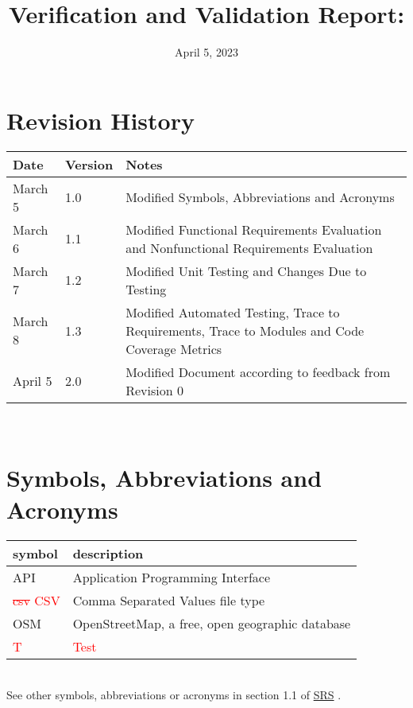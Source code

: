 \documentclass[12pt, titlepage]{article}
\begin{document}
\title{Verification and Validation Report: \progname} 
\author{\authname}
\date{April 5, 2023}
	
\maketitle


\section{Revision History}

\begin{tabularx}{\textwidth}{p{3cm}p{2cm}X}
\toprule {\bf Date} & {\bf Version} & {\bf Notes}\\
\midrule
March 5 & 1.0 & Modified Symbols, Abbreviations and Acronyms\\
March 6 & 1.1 & Modified Functional Requirements Evaluation and Nonfunctional Requirements Evaluation\\
March 7 & 1.2 & Modified Unit Testing and Changes Due to Testing\\
March 8 & 1.3 & Modified Automated Testing, Trace to Requirements, Trace to Modules and Code Coverage Metrics\\
April 5 & 2.0 & Modified Document according to feedback from Revision 0\\
\bottomrule
\end{tabularx}

~\newpage

\section{Symbols, Abbreviations and Acronyms}

\renewcommand{\arraystretch}{1.2}
\begin{tabular}{l l} 
  \toprule		
  \textbf{symbol} & \textbf{description}\\
  \midrule 
  API & Application Programming Interface\\
  \textcolor{red}{\sout{csv} CSV} & Comma Separated Values file type\\
  OSM & OpenStreetMap, a free, open geographic database\\
  \textcolor{red}{T} & \textcolor{red}{Test}\\
  \bottomrule
\end{tabular}\\

See other symbols, abbreviations or acronyms in section 1.1 of \href{https://github.com/paezha/PyERT-BLACK/blob/main/docs/SRS/SRS.pdf}{SRS} \citep{SRS}.
\end{document}
